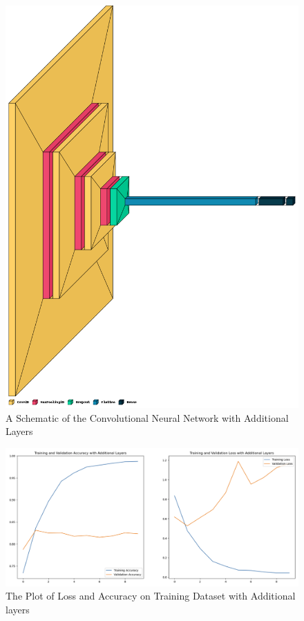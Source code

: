 \documentclass[11pt,a4paper]{article}
\begin{document}
  \begin{figure}[h!]
 \centering
  \includegraphics[width=0.85\linewidth]{refined_schema.png}
  \caption{A Schematic of the Convolutional Neural Network with Additional Layers}
  \label{refined_schema}
\end{figure}
 
 \begin{figure}[h!]
 \centering
  \includegraphics[width=\linewidth]{Model with Additional Layers.png}
  \caption{The Plot of Loss and Accuracy on Training Dataset with Additional layers}
  \label{refined_model_training}
\end{figure}
\FloatBarrier
\end{document}
